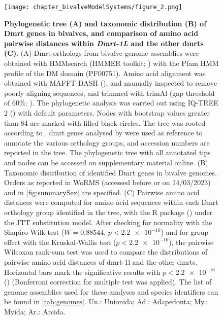 \begin{figure}[t!]
	\centering
	\texttt{[image: chapter\_bivalveModelSystems/figure\_2.png]}
	\captionsetup[subfigure]{labelformat=nocaption}
	\begin{subfigure}{0\linewidth}
	\caption{}\label{fig:dmrt-A}
	\end{subfigure}%
	\begin{subfigure}{0\linewidth}
	\caption{}\label{fig:dmrt-B}
	\end{subfigure}%
	\begin{subfigure}{0\linewidth}
	\caption{}\label{fig:dmrt-C}
	\end{subfigure}%
	\caption[\textbf{Phylogenetic tree (A) and taxonomic distribution (B) of Dmrt genes in bivalves, and comparison of amino acid pairwise distances within \textit{Dmrt-1L} and the other \glspl{dmrt} (B)}]
	{
		\textbf{Phylogenetic tree (A) and taxonomic distribution (B) of Dmrt genes in bivalves, and comparison of amino acid pairwise distances within \textit{Dmrt-1L} and the other \glspl{dmrt} (C)}. (A) Dmrt orthologs from bivalve genome assemblies were obtained with HMMsearch (HMMER toolkit; ) with the Pfam HMM profile of the DM domain (PF00751). Amino acid alignment was obtained with MAFFT-DASH (), and manually inspected to remove poorly aligning sequences, and trimmed with trimAl (gap threshold of 60\%; ). The phylogenetic analysis was carried out using IQ-TREE 2 () with default parameters. Nodes with bootstrap values greater than 84 are marked with filled black circles. The tree was rooted according to . \gls{dmrt} genes analysed by  were used as reference to annotate the various orthology groups, and accession numbers are reported in the tree. The phylogenetic tree with all annotated tips and nodes can be accessed on supplementary material online. (B) Taxonomic distribution of identified Dmrt genes in bivalve genomes. Orders as reported in WoRMS (accessed before or on 14/03/2023) and in \cref{fig:summarySex} are specified. (C) Pairwise amino acid distances were computed for amino acid sequences within each Dmrt orthology group identified in the tree, with the R package  () under the JTT substitution model. After checking for normality with the Shapiro-Wilk test ($W = 0.88544$, $p < \num{2.2e-16}$) and for group effect with the Kruskal-Wallis test ($p < \num{2.2e-16}$), the pairwise Wilcoxon rank-sum test was used to compare the distributions of pairwise amino acid distances of \gls{dmrt-1l} and the other \glspl{dmrt}. Horizontal bars mark the significative results with $p < \num{2.2e-16}$ (\singlecurlyquotes{****}) (Bonferroni correction for multiple test was applied). The list of genome assemblies used for these analyses and species identifiers can be found in \cref{tab:genomes}. Un.: Unionida; Ad.: Adapedonta; My.: Myida; Ar.: Arcida.
	}

	\label{fig:dmrt}
\end{figure}

